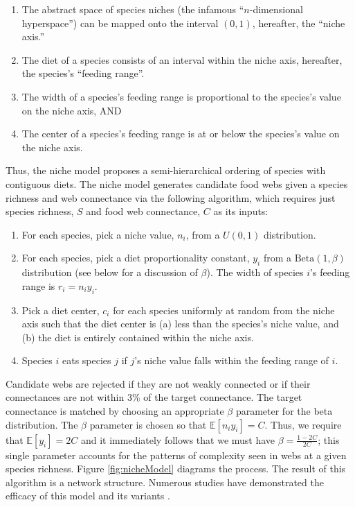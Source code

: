 \documentclass[/home/nkappler/Research/Dissertation/
 dissertation.tex]{subfiles}
\begin{document}
\begin{bibunit}
\begin{enumerate}
    \item The abstract space of species niches (the infamous ``$n$-dimensional
        hyperspace'') can be mapped onto the interval $(0,1)$,
        hereafter, the ``niche axis.''
    \item The diet of a species consists of an interval within the niche
        axis, hereafter, the species's ``feeding range''.
    \item The width of a  species's feeding range is proportional to the
        species's value on the niche axis, AND
    \item The center of a species's feeding range is at or below the species's
        value on the niche axis.
\end{enumerate}

Thus, the niche model proposes a semi-hierarchical ordering of species with
contiguous diets. The niche model generates candidate food webs given a species
richness and web connectance via the following algorithm, which requires just
species richness, $S$ and food web connectance, $C$ as its inputs:

\begin{enumerate}
    \item For each species, pick a niche value, $n_i$, from a $U(0,1)$ distribution.
    \item For each species, pick a diet proportionality constant, $y_i$ from a
        $\text{Beta}(1,\beta)$ distribution (see below for a discussion of
        $\beta$). The width of species $i$'s feeding range is $r_i = n_iy_i$.
    \item Pick a diet center, $c_i$ for each species uniformly at random from
        the niche axis such that the diet center is (a) less than the species's
        niche value, and (b) the diet is entirely contained within the niche
        axis.
    \item Species $i$ eats species $j$ if $j$'s niche value falls within the
        feeding range of $i$.
\end{enumerate}

Candidate webs are rejected if they are not weakly connected or if their
connectances are not within 3\% of the target connectance. The target
connectance is matched by choosing an appropriate $\beta$ parameter for the
beta distribution. The $\beta$ parameter is chosen so that
$\mathbb{E}[n_iy_i]=C$. Thus, we require that $\mathbb{E}[y_i]=2C$ and it
immediately follows that we must have $\beta = \frac{1-2C}{2C}$; this single
parameter accounts for the patterns of complexity seen in webs at a given
species richness. Figure \ref{fig:nicheModel} diagrams the process. The result
of this algorithm is a network structure. Numerous studies have demonstrated
the efficacy of this model and its variants
\cite{Williams2000,Allesina2008,Williams2008b}.


\end{bibunit}
\end{document}
